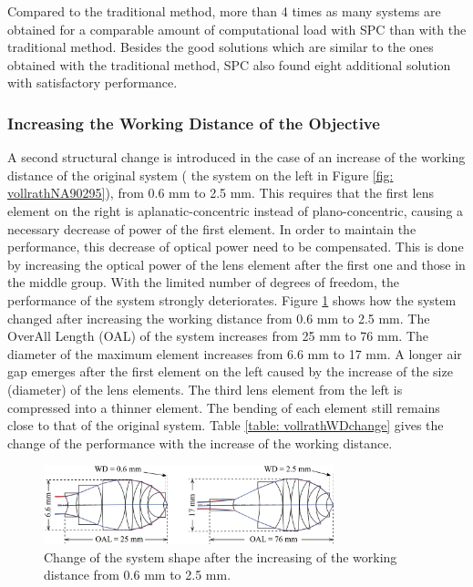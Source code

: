 Compared to the traditional method, more than 4 times as many systems are obtained for a comparable amount of computational load with SPC than with the traditional method. Besides the good solutions which are similar to the ones obtained with the traditional method, SPC also found eight additional solution with satisfactory performance. 

\clearpage
\subsubsection{Increasing the Working Distance of the Objective}
A second structural change is introduced in the case of an increase of the working distance of the original system ( the system on the left in Figure \ref{fig: vollrathNA90295}), from 0.6 mm to 2.5 mm. This requires that the first lens element on the right is aplanatic-concentric instead of plano-concentric, causing a necessary decrease of power of the first element. In order to maintain the performance, this decrease of optical power need to be compensated. This is done by increasing the optical power of the lens element after the first one and those in the middle group. With the limited number of degrees of freedom, the performance of the system strongly deteriorates. Figure \ref{fig: vollrathWD06to25} shows how the system changed after increasing the working distance from 0.6 mm to 2.5 mm. The OverAll Length (OAL) of the system increases from 25 mm to 76 mm. The diameter of the maximum element increases from 6.6 mm to 17 mm. A longer air gap emerges after the first element on the left caused by the increase of the size (diameter) of the lens elements. The third lens element from the left is compressed into a thinner element. The bending of each element still remains close to that of the original system. Table \ref{table: vollrathWDchange} gives the change of the performance with the increase of the working distance. 

\begin{figure}[h!]
    \centering
    \includegraphics[width=0.75\textwidth]{chapter-4/figures/Vollrath_WD06TO25.png}
    \caption{Change of the system shape after the increasing of the working distance from 0.6 mm to 2.5 mm.}
    \label{fig: vollrathWD06to25}
\end{figure}

